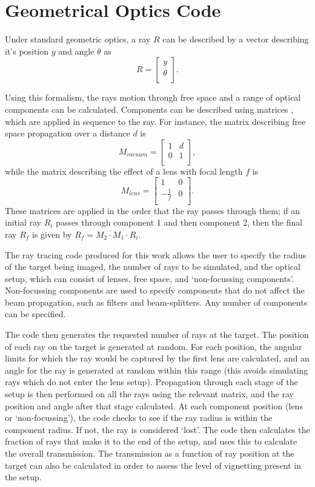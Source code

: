 \section{Geometrical Optics Code} \label{appdx: Ray Tracing}

Under standard geometric optics, a ray $R$ can be described by a vector describing it's position $y$ and angle $\theta$ as 
\[R = 
\begin{bmatrix}
           y \\
           \theta \\
         \end{bmatrix}.
         \]
         
Using this formalism, the rays motion through free space and a range of optical components can be calculated. Components can be described using matrices \cite{Gerrard1975}, which are applied in sequence to the ray. For instance, the matrix describing free space propagation over a distance $d$ is
\[M_{vacuum} = 
\begin{bmatrix}
           1 & d \\
           0 & 1 \\
         \end{bmatrix},
         \]
while the matrix describing the effect of a lens with focal length $f$ is 
\[M_{lens} = 
\begin{bmatrix}
           1 & 0 \\
           -\frac{1}{f} & 0 \\
         \end{bmatrix}.
         \]
These matrices are applied in the order that the ray passes through them; if an initial ray $R_i$ passes through component 1 and then component 2, then the final ray $R_f$ is given by $R_f = M_2 \cdot M_{1} \cdot R_i$.

The ray tracing code produced for this work allows the user to specify the radius of the target being imaged, the number of rays to be simulated, and the optical setup, which can consist of lenses, free space, and `non-focussing components'. Non-focussing components are used to specify components that do not affect the beam propagation, such as filters and beam-splitters. Any number of components can be specified. 

The code then generates the requested number of rays at the target. The position of each ray on the target is generated at random. For each position, the angular limits for which the ray would be captured by the first lens are calculated, and an angle for the ray is generated at random within this range (this avoids simulating rays which do not enter the lens setup). Propagation through each stage of the setup is then performed on all the rays using the relevant matrix, and the ray position and angle after that stage calculated. At each component position (lens or `non-focussing'), the code checks to see if the ray radius is within the component radius. If not, the ray is considered `lost'. The code then calculates the fraction of rays that make it to the end of the setup, and uses this to calculate the overall transmission. The transmission as a function of ray position at the target can also be calculated in order to assess the level of vignetting present in the setup.

